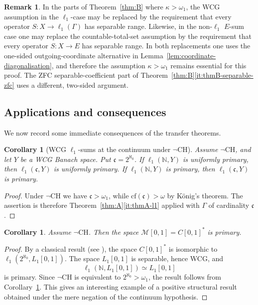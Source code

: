 \documentclass[11pt]{amsart}
\theoremstyle{plain}
\newtheorem{corollary}[theorem]{Corollary}
\theoremstyle{definition}
\newtheorem{remark}[theorem]{Remark}
\numberwithin{equation}{section}
\newcommand{\cf}{\mathrm{cf}}
\newcommand{\CH}{\mathrm{CH}}
\begin{document}
\begin{remark}\label{rem:separable-range}
In the parts of Theorem~\ref{thm:B} where \(\kappa>\omega_1\), the WCG assumption in the \(\ell_1\)-case may be replaced by the requirement that every operator \(S\colon X\to\ell_1(\Gamma)\) has separable range.  Likewise, in the non-\(\ell_1\) \(E\)-sum case one may replace the countable-total-set assumption by the requirement that every operator \(S\colon X\to E\) has separable range.  In both replacements one uses the one-sided outgoing-coordinate alternative in Lemma~\ref{lem:coordinate-diagonalisation}, and therefore the assumption \(\kappa>\omega_1\) remains essential for this proof.  The ZFC separable-coefficient part of Theorem~\ref{thm:B}\ref{it:thmB-separable-zfc} uses a different, two-sided argument.
\end{remark}

\subsection{Applications and consequences}

We now record some immediate consequences of the transfer theorems.

\begin{corollary}[WCG \(\ell_1\)-sums at the continuum under \(\neg\CH\)]\label{cor:wcg-continuum}
Assume \(\neg\CH\), and let \(Y\) be a WCG Banach space.  Put \(\mathfrak c=2^{\aleph_0}\).  If \(\ell_1(\mathbb N,Y)\) is uniformly primary, then \(\ell_1(\mathfrak c,Y)\) is uniformly primary.  If \(\ell_1(\mathbb N,Y)\) is primary, then \(\ell_1(\mathfrak c,Y)\) is primary.
\end{corollary}

\begin{proof}
Under \(\neg\CH\) we have \(\mathfrak c>\omega_1\), while \(\cf(\mathfrak c)>\omega\) by K\"onig's theorem.  The assertion is therefore Theorem~\ref{thm:A}\ref{it:thmA-l1} applied with \(\Gamma\) of cardinality \(\mathfrak c\).
\end{proof}

\begin{corollary}\label{cor:intro-C01}
Assume \(\neg\CH\).  Then the space \(\mathcal{M}[0,1] = C[0,1]^*\) is primary.
\end{corollary}

\begin{proof}
By a classical result (see \cite[Proposition~5.6]{LT2}), the space \(C[0,1]^*\) is isomorphic to \(\ell_1(2^{\aleph_0},L_1[0,1])\).  The space \(L_1[0,1]\) is separable, hence WCG, and
\[
    \ell_1(\mathbb N,L_1[0,1])\simeq L_1[0,1]
\]
is primary.  Since \(\neg\CH\) is equivalent to \(2^{\aleph_0}>\omega_1\), the result follows from Corollary~\ref{cor:wcg-continuum}.  This gives an interesting example of a positive structural result obtained under the mere negation of the continuum hypothesis.
\end{proof}
\end{document}
